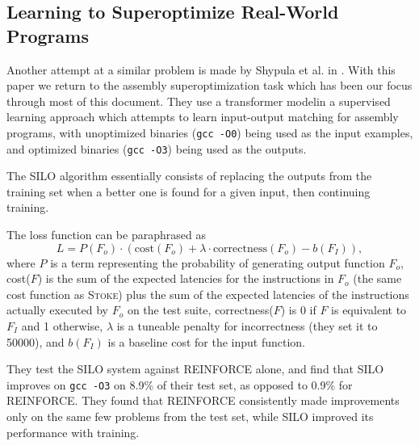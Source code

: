 \documentclass[12pt,twoside]{reedthesis}
\begin{document}

        \subsection{Learning to Superoptimize Real-World Programs}
            Another attempt at a similar problem is made by Shypula et al. in \cite{shypula2022learning}.
            With this paper we return to the assembly superoptimization task which has been our focus through most of this document. 
            They use a transformer model\footnotemark in a supervised learning approach which attempts to learn input-output matching for assembly programs, with unoptimized binaries (\texttt{gcc -O0}) being used as the input examples, and optimized binaries (\texttt{gcc -O3}) being used as the outputs.
            
            
            The SILO algorithm essentially consists of replacing the outputs from the training set when a better one is found for a given input, then continuing training.
            
            The loss function can be paraphrased as 
            \[ L = P(F_o) \cdot (\text{cost}(F_o) + \lambda \cdot \text{correctness}(F_o) - b(F_I)), \]
            where $P$ is a term representing the probability of generating output function $F_o$, cost($F$) is the sum of the expected latencies for the instructions in $F_o$ (the same cost function as \textsc{Stoke}) plus the sum of the expected latencies of the instructions actually executed by $F_o$ on the test suite, correctness($F$) is 0 if $F$ is equivalent to $F_I$ and 1 otherwise, $\lambda$ is a tuneable penalty for incorrectness (they set it to 50000), and $b(F_I)$ is a baseline cost for the input function.
            
            They test the SILO system against REINFORCE alone, and find that SILO improves on \texttt{gcc -O3} on 8.9\% of their test set, as opposed to 0.9\% for REINFORCE.
            They found that REINFORCE consistently made improvements only on the same few problems from the test set, while SILO improved its performance with training.
\end{document}
